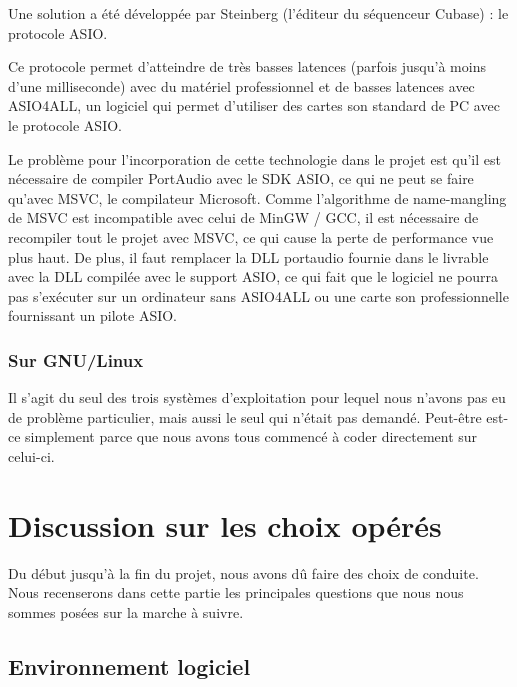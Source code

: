 \documentclass[a4paper,11pt]{article}
\begin{document}
Une solution a été développée par Steinberg (l'éditeur du séquenceur Cubase) : le protocole ASIO.

Ce protocole permet d'atteindre de très basses latences (parfois jusqu'à moins d'une milliseconde) avec
du matériel professionnel et de basses latences avec ASIO4ALL, un logiciel qui permet d'utiliser des cartes son standard de PC avec le protocole ASIO.

Le problème pour l'incorporation de cette technologie dans le projet est qu'il est nécessaire de compiler PortAudio avec le SDK ASIO, ce qui
ne peut se faire qu'avec MSVC, le compilateur Microsoft.
Comme l'algorithme de name-mangling de MSVC est incompatible avec celui de MinGW / GCC, il est nécessaire de recompiler tout le projet avec MSVC, ce qui cause la perte de performance vue plus haut.
De plus, il faut remplacer la DLL portaudio fournie dans le livrable avec la DLL compilée avec le support ASIO, ce qui fait
que le logiciel ne pourra pas s'exécuter sur un ordinateur sans ASIO4ALL ou une carte son professionnelle fournissant un pilote ASIO.


\subsubsection*{Sur GNU/Linux}

Il s'agit du seul des trois systèmes d'exploitation pour lequel nous n'avons pas eu de problème particulier, mais aussi le seul qui n'était pas demandé. Peut-être est-ce simplement parce que nous avons tous commencé à coder directement sur celui-ci.

\clearpage

\section{Discussion sur les choix opérés}

Du début jusqu'à la fin du projet, nous avons dû faire des choix de conduite. Nous recenserons dans cette partie les principales questions que nous nous sommes posées sur la marche à suivre.

\subsection{Environnement logiciel}
\end{document}
